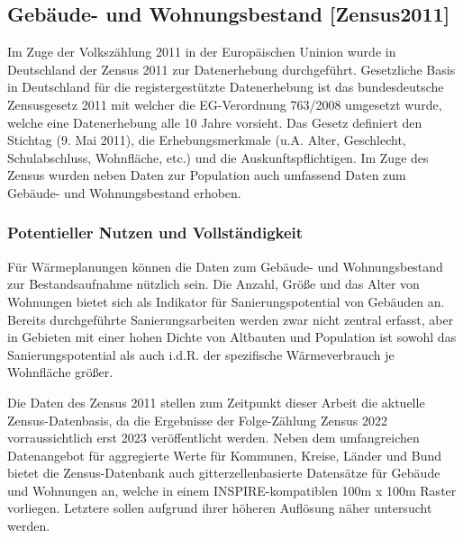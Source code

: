		\subsection{Gebäude- und Wohnungsbestand [Zensus2011]}
		\label{sec:Daten:Datensatz:Zensus2011}
			Im Zuge der Volkszählung 2011 in der Europäischen Uninion wurde in Deutschland der Zensus 2011 zur Datenerhebung durchgeführt. Gesetzliche Basis in Deutschland für die registergestützte Datenerhebung ist das bundesdeutsche Zensusgesetz 2011 mit welcher die EG-Verordnung 763/2008 umgesetzt wurde, welche eine Datenerhebung alle 10 Jahre vorsieht. Das Gesetz definiert den Stichtag (9. Mai 2011), die Erhebungsmerkmale (u.A. Alter, Geschlecht, Schulabschluss, Wohnfläche, etc.) und die Auskunftspflichtigen. Im Zuge des Zensus wurden neben Daten zur Population auch umfassend Daten zum Gebäude- und Wohnungsbestand erhoben.
			
			\subsubsection{Potentieller Nutzen und Vollständigkeit}
				Für Wärmeplanungen können die Daten zum Gebäude- und Wohnungsbestand zur Bestandsaufnahme nützlich sein. Die Anzahl, Größe und das Alter von Wohnungen bietet sich als Indikator für Sanierungspotential von Gebäuden an. Bereits durchgeführte Sanierungsarbeiten werden zwar nicht zentral erfasst, aber in Gebieten mit einer hohen Dichte von Altbauten und Population ist sowohl das Sanierungspotential als auch i.d.R. der spezifische Wärmeverbrauch je Wohnfläche größer. 
				
				Die Daten des Zensus 2011 stellen zum Zeitpunkt dieser Arbeit die aktuelle Zensus-Datenbasis, da die Ergebnisse der Folge-Zählung Zensus 2022 vorraussichtlich erst 2023 veröffentlicht werden. Neben dem umfangreichen Datenangebot für aggregierte Werte für Kommunen, Kreise, Länder und Bund bietet die Zensus-Datenbank auch gitterzellenbasierte Datensätze für Gebäude und Wohnungen an, welche in einem INSPIRE-kompatiblen 100m x 100m Raster vorliegen. Letztere sollen aufgrund ihrer höheren Auflösung näher untersucht werden. 
				
